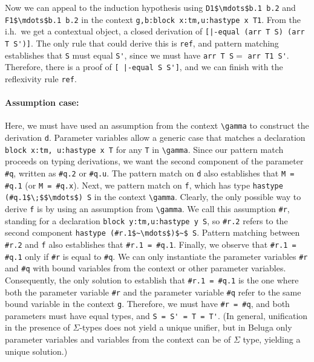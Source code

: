  Now we can appeal to the induction hypothesis using
 \lstinline!D1$\mdots$b.1 b.2! and \lstinline!F1$\mdots$b.1 b.2! in the context
 \lstinline!g,b:block x:tm,u:hastype x T1!. 
  From the i.h.\ we get a
 contextual object, a closed derivation of
 \lstinline![|-equal (arr T S) (arr T S')]!. The only rule that could
 derive this is \lstinline{ref}, and pattern matching establishes that \lstinline{S}
 must equal \lstinline{S'}, since we must have \lstinline!arr T S!$ =$
\lstinline!arr T1 S'!.  Therefore, there is a proof of
\lstinline![ |-equal S S']!, 
 and we can finish with the reflexivity rule \lstinline{ref}.

 \paragraph{Assumption case:} Here, we must have used an assumption from the
 context \lstinline!\gamma! to construct the derivation \lstinline{d}.  Parameter variables
  allow a generic case that matches a declaration 
\lstinline!block x:tm, u:hastype x T! for any \lstinline{T} in \lstinline!\gamma!. Since our pattern match
 proceeds on typing derivations, we want the second component of the
 parameter \lstinline{#q}, written as \lstinline{#q.2} or \lstinline!#q.u!.  The pattern match on \lstinline{d}
 also establishes that \lstinline{M = #q.1} (or \lstinline!M = #q.x!). 
 Next, we pattern match on \lstinline{f}, which has type
\lstinline!hastype (#q.1$\;$$\mdots$) S! in the context \lstinline!\gamma!.  Clearly, the only
 possible way to derive \lstinline{f} is by using an assumption from \lstinline!\gamma!. We call
 this assumption \lstinline{#r}, standing for a declaration 
\lstinline!block y:tm,u:hastype y S!, so \lstinline{#r.2} refers to the second component
\lstinline!hastype (#r.1$~\mdots$)$~$ S!. Pattern matching between \lstinline{#r.2} and \lstinline{f}
 also establishes that %
 \lstinline{#r.1 = #q.1}.  Finally, we observe that \lstinline{#r.1 = #q.1} only if
 \lstinline{#r} is equal to \lstinline{#q}. We can only instantiate the parameter
 variables \lstinline!#r! and \lstinline!#q! with bound variables from
 the context or other parameter variables. Consequently, the only
 solution to establish that \lstinline{#r.1 = #q.1} is the one where both the
 parameter variable \lstinline!#r! and the parameter variable
 \lstinline!#q! refer to the same bound variable in
 the context \lstinline!g!.  Therefore, we must have 
 \lstinline!#r = #q!, and both
 parameters must have equal types, and \lstinline{S = S' = T = T'}.  (In general,
 unification in the presence 
 of $\Sigma$-types does not yield a unique unifier, but in Beluga only
 parameter variables and variables from the context can be of $\Sigma$ type,
 yielding a unique solution.)



